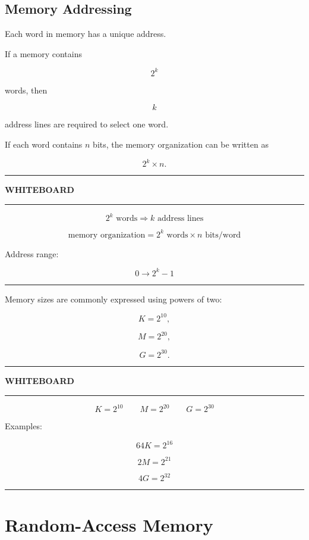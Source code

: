 \documentclass[11pt]{article}
\newenvironment{whiteboard}
{
    \par\medskip
    \hrule
    \vspace{0.35em}
    \noindent\textbf{\large WHITEBOARD}
    \par\vspace{0.3em}
    \hrule
    \vspace{0.65em}
}
{
    \vspace{0.45em}
    \hrule
    \par\medskip
}
\begin{document}
\subsection{Memory Addressing}

Each word in memory has a unique address.

If a memory contains

\[
2^k
\]

words, then

\[
k
\]

address lines are required to select one word.

If each word contains \(n\) bits, the memory organization can be written as

\[
2^k\times n.
\]

\begin{whiteboard}

\[
\boxed{
2^k\text{ words}
\Rightarrow
k\text{ address lines}
}
\]

\[
\boxed{
\text{memory organization}
=
2^k\text{ words}\times n\text{ bits/word}
}
\]

Address range:

\[
0
\rightarrow
2^k-1
\]

\end{whiteboard}

Memory sizes are commonly expressed using powers of two:

\[
K=2^{10},
\]

\[
M=2^{20},
\]

\[
G=2^{30}.
\]

\begin{whiteboard}

\[
\boxed{
K=2^{10}
}
\qquad
\boxed{
M=2^{20}
}
\qquad
\boxed{
G=2^{30}
}
\]

Examples:

\[
64K=2^{16}
\]

\[
2M=2^{21}
\]

\[
4G=2^{32}
\]

\end{whiteboard}

\section{Random-Access Memory}
\end{document}
